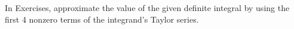 \begin{exerciseset}{In Exercises}{, approximate the value of the given definite integral by using the first 4 nonzero terms of the integrand's Taylor series. }



\end{exerciseset}

